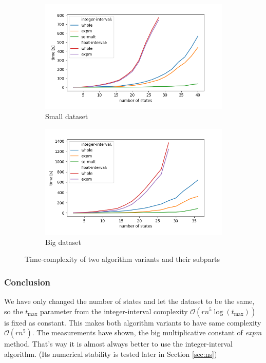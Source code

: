 \documentclass[thesis=M,english]{FITthesis}[2012/10/20]
\begin{document}
\begin{figure}
\centering
\begin{subfigure}{1\textwidth}
  \centering
  \includegraphics[width=1\linewidth]{img/ex2/small.png}
  \caption{Small dataset}
  \label{fig:e2small}
\end{subfigure}
\begin{subfigure}{1\textwidth}
  \centering
  \includegraphics[width=\linewidth]{img/ex2/big.png}
  \caption{Big dataset}
  \label{fig:e2big}
\end{subfigure}
\caption{ Time-complexity of two algorithm variants and their subparts }
\label{fig:e2n}
\end{figure}

\subsubsection*{ Conclusion }

We have only changed the number of states and let the dataset to be the same, so the $t_{\max}$ parameter from the integer-interval complexity $\mathcal{O}(r n^5 \log(t_{\max}))$ is fixed as constant. This makes both algorithm variants to have same complexity $\mathcal{O}(r n^5)$. The measurements have shown, the big multiplicative constant of \textit{expm} method. That's way it is almost always better to use the integer-interval algorithm. (Its numerical stability is tested later in Section \ref{sec:ns}) 
\end{document}
